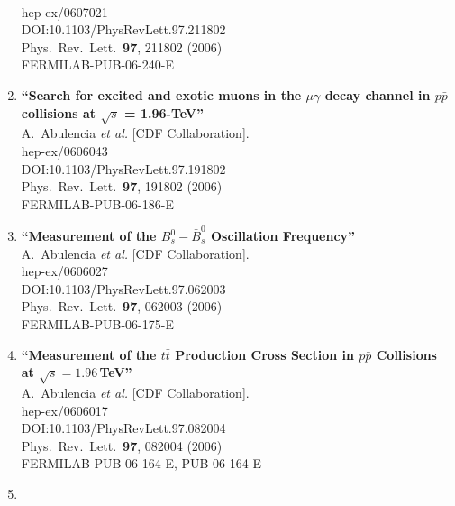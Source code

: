 \documentclass{article}
\begin{document}
\begin{enumerate}
  \\{}hep-ex/0607021
  \\{}DOI:10.1103/PhysRevLett.97.211802
  \\{}Phys.\ Rev.\ Lett.\  {\bf 97}, 211802 (2006)
  \\{}FERMILAB-PUB-06-240-E
\item%
{\bf ``Search for excited and exotic muons in the $\mu \gamma$ decay channel in $p \bar{p}$ collisions at $\sqrt{s}$ = 1.96-TeV''}
  \\{}A.~Abulencia {\it et al.} [CDF Collaboration].
  \\{}hep-ex/0606043
  \\{}DOI:10.1103/PhysRevLett.97.191802
  \\{}Phys.\ Rev.\ Lett.\  {\bf 97}, 191802 (2006)
  \\{}FERMILAB-PUB-06-186-E
\item%
{\bf ``Measurement of the $B^0_{s}-\bar{B}^0_s$ Oscillation Frequency''}
  \\{}A.~Abulencia {\it et al.} [CDF Collaboration].
  \\{}hep-ex/0606027
  \\{}DOI:10.1103/PhysRevLett.97.062003
  \\{}Phys.\ Rev.\ Lett.\  {\bf 97}, 062003 (2006)
  \\{}FERMILAB-PUB-06-175-E
\item%
{\bf ``Measurement of the $t \bar{t}$ Production Cross Section in $p \bar{p}$ Collisions at $\sqrt{s} = 1.96$\,TeV''}
  \\{}A.~Abulencia {\it et al.} [CDF Collaboration].
  \\{}hep-ex/0606017
  \\{}DOI:10.1103/PhysRevLett.97.082004
  \\{}Phys.\ Rev.\ Lett.\  {\bf 97}, 082004 (2006)
  \\{}FERMILAB-PUB-06-164-E, PUB-06-164-E
\item%

\end{enumerate}
\end{document}
